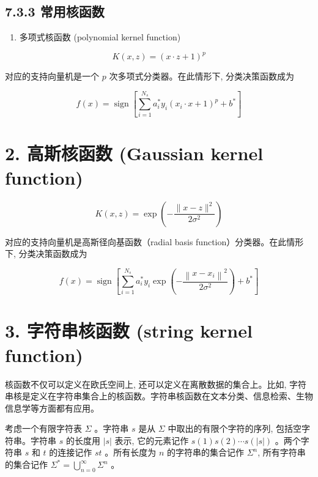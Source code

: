 \documentclass[10pt]{article}
\begin{document}
\subsection*{7.3.3 常用核函数}
\begin{enumerate}
  \item 多项式核函数 (polynomial kernel function)
\end{enumerate}


\begin{equation*}
K(x, z)=(x \cdot z+1)^{p} \tag{7.88}
\end{equation*}


对应的支持向量机是一个 $p$ 次多项式分类器。在此情形下, 分类决策函数成为


\begin{equation*}
f(x)=\operatorname{sign}\left[\sum_{i=1}^{N_{s}} a_{i}^{*} y_{i}\left(x_{i} \cdot x+1\right)^{p}+b^{*}\right] \tag{7.89}
\end{equation*}


\section*{2. 高斯核函数 (Gaussian kernel function)}

\begin{equation*}
K(x, z)=\exp \left(-\frac{\|x-z\|^{2}}{2 \sigma^{2}}\right) \tag{7.90}
\end{equation*}


对应的支持向量机是高斯径向基函数（radial basis function）分类器。在此情形下, 分类决策函数成为


\begin{equation*}
f(x)=\operatorname{sign}\left[\sum_{i=1}^{N_{s}} a_{i}^{*} y_{i} \exp \left(-\frac{\left\|x-x_{i}\right\|^{2}}{2 \sigma^{2}}\right)+b^{*}\right] \tag{7.91}
\end{equation*}


\section*{3. 字符串核函数 (string kernel function)}
核函数不仅可以定义在欧氏空间上, 还可以定义在离散数据的集合上。比如, 字符串核是定义在字符串集合上的核函数。字符串核函数在文本分类、信息检索、生物信息学等方面都有应用。

考虑一个有限字符表 $\Sigma$ 。字符串 $s$ 是从 $\Sigma$ 中取出的有限个字符的序列, 包括空字符串。字符串 $s$ 的长度用 $|s|$ 表示, 它的元素记作 $s(1) s(2) \cdots s(|s|)$ 。两个字符串 $s$ 和 $t$ 的连接记作 $s t$ 。所有长度为 $n$ 的字符串的集合记作 $\Sigma^{n}$, 所有字符串的集合记作 $\Sigma^{*}=\bigcup_{n=0}^{\infty} \Sigma^{n}$ 。
\end{document}
